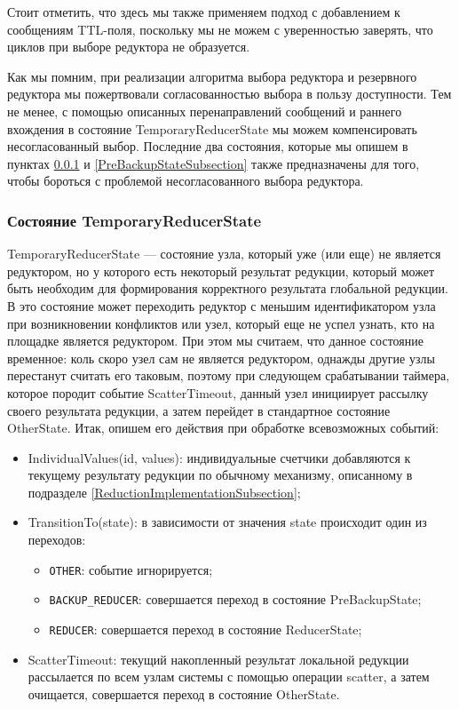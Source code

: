 Стоит отметить, что здесь мы также применяем подход с добавлением к сообщениям TTL-поля, поскольку мы не можем с уверенностью заверять, что циклов при выборе редуктора не образуется.

Как мы помним, при реализации алгоритма выбора редуктора и резервного редуктора мы пожертвовали согласованностью выбора в пользу доступности. Тем не менее, с помощью описанных перенаправлений сообщений и раннего вхождения в состояние TemporaryReducerState мы можем компенсировать несогласованный выбор. Последние два состояния, которые мы опишем в пунктах \ref{TemporaryReducerStateSubsection} и \ref{PreBackupStateSubsection} также предназначены для того, чтобы бороться с проблемой несогласованного выбора редуктора.

\subsubsection{Состояние TemporaryReducerState}
\label{TemporaryReducerStateSubsection}

TemporaryReducerState --- состояние узла, который уже (или еще) не является редуктором, но у которого есть некоторый результат редукции, который может быть необходим для формирования корректного результата глобальной редукции. В это состояние может переходить редуктор с меньшим идентификатором узла при возникновении конфликтов или узел, который еще не успел узнать, кто на площадке является редуктором. При этом мы считаем, что данное состояние временное: коль скоро узел сам не является редуктором, однажды другие узлы перестанут считать его таковым, поэтому при следующем срабатывании таймера, которое породит событие ScatterTimeout, данный узел инициирует рассылку своего результата редукции, а затем перейдет в стандартное состояние OtherState. Итак, опишем его действия при обработке всевозможных событий:

\begin{itemize}
    \item IndividualValues(id, values): индивидуальные счетчики добавляются к текущему результату редукции по обычному механизму, описанному в подразделе \ref{ReductionImplementationSubsection};
    
    \item TransitionTo(state): в зависимости от значения state происходит один из переходов:
        
        \begin{itemize}
            \item \texttt{OTHER}: событие игнорируется;
            \item \texttt{BACKUP\_REDUCER}: совершается переход в состояние PreBackupState;
            \item \texttt{REDUCER}: совершается переход в состояние ReducerState;
        \end{itemize}
        
    \item ScatterTimeout: текущий накопленный результат локальной редукции рассылается по всем узлам системы с помощью операции scatter, а затем очищается, совершается переход в состояние OtherState.
\end{itemize}

